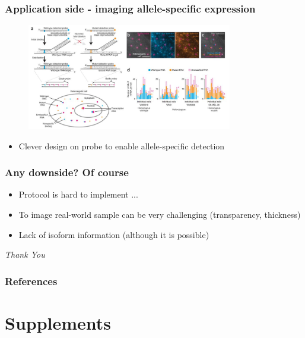 \documentclass{beamer}
\begin{document}
  \begin{frame}
  \frametitle{Application side - imaging allele-specific expression}
  \begin{figure}
    \centering
    \includegraphics[width=0.8\textwidth]{ase}
    \cite{levesque2013visualizing}
  \end{figure}
  \begin{itemize}
    \item Clever design on probe to enable allele-specific detection
  \end{itemize}
  \end{frame}

  \begin{frame}
  \frametitle{Any downside? Of course}
  \begin{itemize}
    \item Protocol is hard to implement ...
    \item To image real-world sample can be very challenging (transparency, thickness)
    \item Lack of isoform information (although it is possible)
  \end{itemize}
  \end{frame}

\begin{frame}{}
  \centering \Huge
  \emph{Thank You}
\end{frame}

\begin{frame}[allowframebreaks]
\frametitle{References}
\footnotesize


\end{frame}

\appendix
\section{Supplements}
\end{document}
